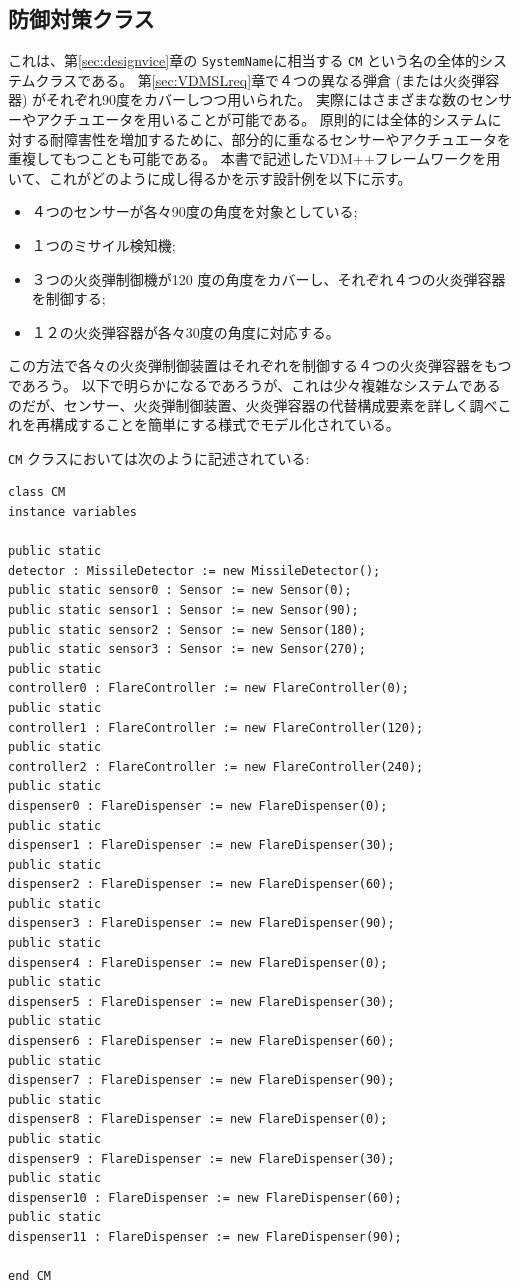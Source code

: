 \documentclass[\pformat,12pt]{jreport}
\begin{document}
\subsection{防御対策クラス}

これは、第\ref{sec:designvice}章の \texttt{SystemName}に相当する \texttt{CM} という名の全体的システムクラスである。
第\ref{sec:VDMSLreq}章で４つの異なる弾倉 (または火炎弾容器) がそれぞれ90度をカバーしつつ用いられた。
実際にはさまざまな数のセンサーやアクチュエータを用いることが可能である。
原則的には全体的システムに対する耐障害性を増加するために、部分的に重なるセンサーやアクチュエータを重複してもつことも可能である。
本書で記述したVDM++フレームワークを用いて、これがどのように成し得るかを示す設計例を以下に示す。
\begin{itemize}
\item ４つのセンサーが各々90度の角度を対象としている;
\item １つのミサイル検知機;
\item ３つの火炎弾制御機が120 度の角度をカバーし、それぞれ４つの火炎弾容器を制御する;
\item １２の火炎弾容器が各々30度の角度に対応する。
\end{itemize}

この方法で各々の火炎弾制御装置はそれぞれを制御する４つの火炎弾容器をもつであろう。
以下で明らかになるであろうが、これは少々複雑なシステムであるのだが、センサー、火炎弾制御装置、火炎弾容器の代替構成要素を詳しく調べこれを再構成することを簡単にする様式でモデル化されている。

\texttt{CM} クラスにおいては次のように記述されている:
\newpage

\begin{lstlisting}
class CM
instance variables

public static 
detector : MissileDetector := new MissileDetector();
public static sensor0 : Sensor := new Sensor(0);
public static sensor1 : Sensor := new Sensor(90);
public static sensor2 : Sensor := new Sensor(180);
public static sensor3 : Sensor := new Sensor(270);
public static 
controller0 : FlareController := new FlareController(0);
public static 
controller1 : FlareController := new FlareController(120);
public static 
controller2 : FlareController := new FlareController(240);
public static 
dispenser0 : FlareDispenser := new FlareDispenser(0);
public static 
dispenser1 : FlareDispenser := new FlareDispenser(30);
public static 
dispenser2 : FlareDispenser := new FlareDispenser(60);
public static 
dispenser3 : FlareDispenser := new FlareDispenser(90);
public static 
dispenser4 : FlareDispenser := new FlareDispenser(0);
public static 
dispenser5 : FlareDispenser := new FlareDispenser(30);
public static 
dispenser6 : FlareDispenser := new FlareDispenser(60);
public static 
dispenser7 : FlareDispenser := new FlareDispenser(90);
public static 
dispenser8 : FlareDispenser := new FlareDispenser(0);
public static 
dispenser9 : FlareDispenser := new FlareDispenser(30);
public static 
dispenser10 : FlareDispenser := new FlareDispenser(60);
public static 
dispenser11 : FlareDispenser := new FlareDispenser(90);

end CM
\end{lstlisting}
\end{document}
